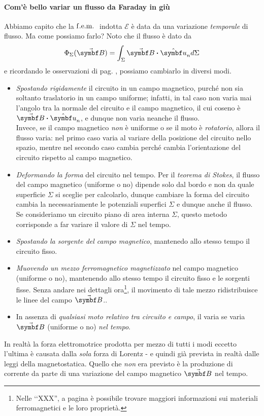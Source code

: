 \paragraph{Com'è bello variar un flusso da Faraday in giù}
Abbiamo capito che la $\mathrm{f.e.m.}\ $ indotta $\mathcal{E}$ è data da una variazione \textit{temporale} di flusso. Ma come possiamo farlo? Noto che il flusso è dato da
\begin{equation*}
	\Phi_\Sigma(\vba B)=\int_\Sigma \vba B\vdot \vbh{u}_n d\Sigma	
\end{equation*}
e ricordando le osservazioni di pag. \pageref{osservazioniFaraday}, possiamo cambiarlo in diversi modi.
\begin{itemize}
	\item \textit{Spostando rigidamente} il circuito in un campo magnetico, purché non sia soltanto traslatorio in un campo uniforme; infatti, in tal caso non varia mai l'angolo tra la normale del circuito e il campo magnetico, il cui coseno è $\vba{B}\vdot \vbh{u}_n$, e dunque non varia neanche il flusso.\\
	Invece, se il campo magnetico \textit{non} è uniforme o se il moto è \textit{rotatorio}, allora il flusso varia: nel primo caso varia al variare della posizione del circuito nello spazio, mentre nel secondo caso cambia perché cambia l'orientazione del circuito rispetto al campo magnetico.
	\item \textit{Deformando la forma} del circuito nel tempo. Per il \textit{teorema di Stokes}, il flusso del campo magnetico (uniforme o no) dipende solo dal bordo e non da quale superficie $\Sigma$ si sceglie per calcolarlo, dunque cambiare la forma del circuito cambia la necessariamente le potenziali superfici $\Sigma$ e dunque anche il flusso. Se consideriamo un circuito piano di area interna $\Sigma$, questo metodo corrisponde a far variare il valore di $\Sigma$ nel tempo.
	\item \textit{Spostando la sorgente del campo magnetico}, mantenedo allo stesso tempo il circuito fisso.
	\item \textit{Muovendo un mezzo ferromagnetico magnetizzato} nel campo magnetico (uniforme o no), mantenendo allo stesso tempo il circuito fisso e le sorgenti fisse. Senza andare nei dettagli ora\footnote{Nelle ‘‘XXX'', a pagina \pageref{ferromagnetico} è possibile trovare maggiori informazioni sui materiali ferromagnetici e le loro proprietà.}, il movimento di tale mezzo ridistribuisce le linee del campo $\vba{B}$..
	\item In assenza di \textit{qualsiasi moto relativo tra circuito e campo}, il varia se varia $\vba B$ (uniforme o no) \textit{nel tempo}. 
\end{itemize}
In realtà la forza elettromotrice prodotta per mezzo di tutti i modi eccetto l'ultima è causata dalla \textit{sola} forza di Lorentz - e quindi già prevista in realtà dalle leggi della magnetostatica. Quello che \textit{non} era previsto è la produzione di corrente da parte di una variazione del campo magnetico $\vba B$ nel tempo.\label{faradayavevaascopertoiltempo}
